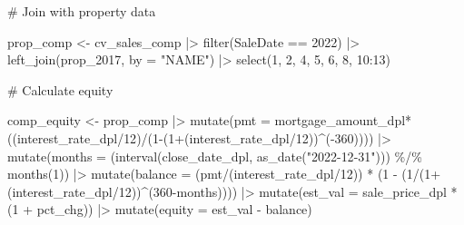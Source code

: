 \documentclass[
  letterpaper,
  DIV=11,
  numbers=noendperiod]{scrartcl}
\newenvironment{Shaded}{\begin{snugshade}}{\end{snugshade}}
\newcommand{\AttributeTok}[1]{\textcolor[rgb]{0.40,0.45,0.13}{#1}}
\newcommand{\CommentTok}[1]{\textcolor[rgb]{0.37,0.37,0.37}{#1}}
\newcommand{\DecValTok}[1]{\textcolor[rgb]{0.68,0.00,0.00}{#1}}
\newcommand{\FunctionTok}[1]{\textcolor[rgb]{0.28,0.35,0.67}{#1}}
\newcommand{\NormalTok}[1]{\textcolor[rgb]{0.00,0.23,0.31}{#1}}
\newcommand{\OtherTok}[1]{\textcolor[rgb]{0.00,0.23,0.31}{#1}}
\newcommand{\SpecialCharTok}[1]{\textcolor[rgb]{0.37,0.37,0.37}{#1}}
\newcommand{\StringTok}[1]{\textcolor[rgb]{0.13,0.47,0.30}{#1}}
\begin{document}
\begin{Shaded}
\begin{Highlighting}[]
\CommentTok{\# Join with property data}

\NormalTok{prop\_comp }\OtherTok{\textless{}{-}}\NormalTok{ cv\_sales\_comp }\SpecialCharTok{|\textgreater{}} 
  \FunctionTok{filter}\NormalTok{(SaleDate }\SpecialCharTok{==} \DecValTok{2022}\NormalTok{) }\SpecialCharTok{|\textgreater{}} 
  \FunctionTok{left\_join}\NormalTok{(prop\_2017, }\AttributeTok{by =} \StringTok{"NAME"}\NormalTok{) }\SpecialCharTok{|\textgreater{}} 
  \FunctionTok{select}\NormalTok{(}\DecValTok{1}\NormalTok{, }\DecValTok{2}\NormalTok{, }\DecValTok{4}\NormalTok{, }\DecValTok{5}\NormalTok{, }\DecValTok{6}\NormalTok{, }\DecValTok{8}\NormalTok{, }\DecValTok{10}\SpecialCharTok{:}\DecValTok{13}\NormalTok{)}

\CommentTok{\# Calculate equity}

\NormalTok{comp\_equity }\OtherTok{\textless{}{-}}\NormalTok{ prop\_comp }\SpecialCharTok{|\textgreater{}} 
  \FunctionTok{mutate}\NormalTok{(}\AttributeTok{pmt =}\NormalTok{  mortgage\_amount\_dpl}\SpecialCharTok{*}\NormalTok{((interest\_rate\_dpl}\SpecialCharTok{/}\DecValTok{12}\NormalTok{)}\SpecialCharTok{/}\NormalTok{(}\DecValTok{1}\SpecialCharTok{{-}}\NormalTok{(}\DecValTok{1}\SpecialCharTok{+}\NormalTok{(interest\_rate\_dpl}\SpecialCharTok{/}\DecValTok{12}\NormalTok{))}\SpecialCharTok{\^{}}\NormalTok{(}\SpecialCharTok{{-}}\DecValTok{360}\NormalTok{)))) }\SpecialCharTok{|\textgreater{}} 
  \FunctionTok{mutate}\NormalTok{(}\AttributeTok{months =}\NormalTok{ (}\FunctionTok{interval}\NormalTok{(close\_date\_dpl, }\FunctionTok{as\_date}\NormalTok{(}\StringTok{"2022{-}12{-}31"}\NormalTok{))) }\SpecialCharTok{\%/\%} \FunctionTok{months}\NormalTok{(}\DecValTok{1}\NormalTok{)) }\SpecialCharTok{|\textgreater{}}
  \FunctionTok{mutate}\NormalTok{(}\AttributeTok{balance =}\NormalTok{ (pmt}\SpecialCharTok{/}\NormalTok{(interest\_rate\_dpl}\SpecialCharTok{/}\DecValTok{12}\NormalTok{)) }\SpecialCharTok{*}\NormalTok{ (}\DecValTok{1} \SpecialCharTok{{-}}\NormalTok{ (}\DecValTok{1}\SpecialCharTok{/}\NormalTok{(}\DecValTok{1}\SpecialCharTok{+}\NormalTok{(interest\_rate\_dpl}\SpecialCharTok{/}\DecValTok{12}\NormalTok{))}\SpecialCharTok{\^{}}\NormalTok{(}\DecValTok{360}\SpecialCharTok{{-}}\NormalTok{months)))) }\SpecialCharTok{|\textgreater{}}
  \FunctionTok{mutate}\NormalTok{(}\AttributeTok{est\_val =}\NormalTok{ sale\_price\_dpl }\SpecialCharTok{*}\NormalTok{ (}\DecValTok{1} \SpecialCharTok{+}\NormalTok{ pct\_chg)) }\SpecialCharTok{|\textgreater{}}
  \FunctionTok{mutate}\NormalTok{(}\AttributeTok{equity =}\NormalTok{ est\_val }\SpecialCharTok{{-}}\NormalTok{ balance)}
\end{Highlighting}
\end{Shaded}
\end{document}
